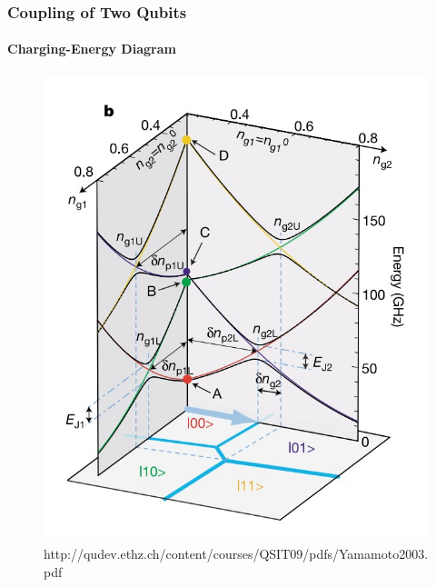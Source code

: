 \documentclass{beamer}
\begin{document}
\begin{frame}
    \frametitle{Coupling of Two Qubits}
    \framesubtitle{Charging-Energy Diagram}
    \begin{figure}[ht!]
        \centering
        \includegraphics[height=0.6\textheight]{img/charging-energy-diagram.jpg}
        \caption{http://qudev.ethz.ch/content/courses/QSIT09/pdfs/Yamamoto2003.pdf}
    \end{figure}
\end{frame}

\end{document}
